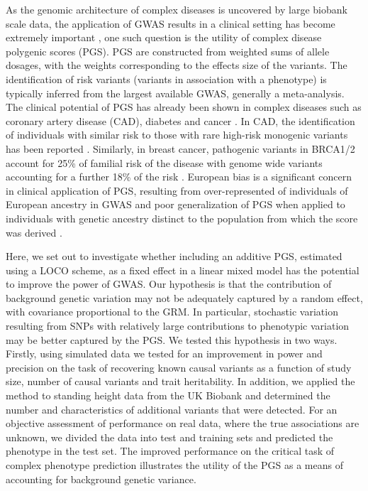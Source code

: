 \documentclass[doublespacing]{bmcart}
\begin{document}
As the genomic architecture of complex diseases is uncovered by large biobank scale data, the application of GWAS results in a clinical setting has become extremely important \cite{tam2019benefits}, one such question is the utility of complex disease polygenic scores (PGS). PGS are constructed from weighted sums of allele dosages, with the weights corresponding to the effects size of the variants. The identification of risk variants (variants in association with a phenotype) is typically inferred from the largest available GWAS, generally a meta-analysis. The clinical potential of PGS has already been shown in complex diseases such as coronary artery disease (CAD), diabetes and cancer  \cite{khera2018genome, torkamani2018personal, yanes2020clinical}. In CAD, the identification of individuals with similar risk to those with rare high-risk monogenic variants has been reported \cite{khera2018genome}. Similarly, in breast cancer, pathogenic variants in BRCA1/2 account for 25\% of familial risk of the disease with genome wide variants accounting for a further 18\% of the risk \cite{yanes2020clinical}. European bias is a significant concern in clinical application of PGS, resulting from over-represented of individuals of European ancestry in GWAS and poor generalization of PGS when applied to individuals with genetic ancestry distinct to the population from which the score was derived \cite{lambert2019towards,duncan2019analysis}.  

\par

Here, we set out to investigate whether including an additive PGS, estimated using a LOCO scheme, as a fixed effect in a linear mixed model has the potential to improve the power of GWAS. Our hypothesis is that the contribution of background genetic variation may not be adequately captured by a random effect, with covariance proportional to the GRM. In particular, stochastic variation resulting from SNPs with relatively large contributions to phenotypic variation may be better captured by the PGS. We tested this hypothesis in two ways. Firstly, using simulated data we tested for an improvement in power and precision on the task of recovering known causal variants as a function of study size, number of causal variants and trait heritability. In addition, we applied the method to standing height data from the UK Biobank and determined the number and characteristics of additional variants that were detected. For an objective assessment of performance on real data, where the true associations are unknown, we divided the data into test and training sets and predicted the phenotype in the test set. The improved performance on the critical task of complex phenotype prediction illustrates the utility of the PGS as a means of accounting for background genetic variance.
\end{document}
